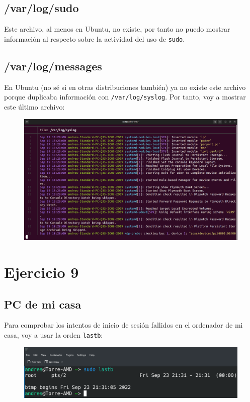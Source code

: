 \documentclass{article}
\begin{document}
\subsection*{/var/log/sudo}
Este archivo, al menos en Ubuntu, no existe, por tanto no puedo mostrar información al respecto sobre la actividad del uso de \verb|sudo|.

\subsection*{/var/log/messages}
En Ubuntu (no sé si en otras distribuciones también) ya no existe este archivo porque duplicaba información con \verb|/var/log/syslog|. Por tanto, voy a mostrar este último archivo:

\begin{figure}[H]
    \includegraphics[width=\textwidth]{imagenes/syslog.png}
\end{figure}

\section*{Ejercicio 9}

\subsection*{PC de mi casa}
Para comprobar los intentos de inicio de sesión fallidos en el ordenador de mi casa, voy a usar la orden \verb|lastb|:

\begin{figure}[H]
    \includegraphics[width=\textwidth]{imagenes/lastbcasa.png}
\end{figure}
\end{document}
